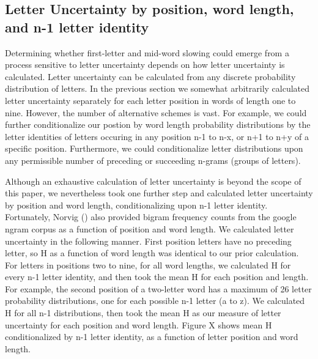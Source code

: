 \documentclass[floatsintext,man]{apa6}
\theoremstyle{definition}
\theoremstyle{definition}
\theoremstyle{definition}
\theoremstyle{remark}
\begin{document}
\subsection{Letter Uncertainty by position, word length, and n-1 letter
identity}\label{letter-uncertainty-by-position-word-length-and-n-1-letter-identity}

Determining whether first-letter and mid-word slowing could emerge from
a process sensitive to letter uncertainty depends on how letter
uncertainty is calculated. Letter uncertainty can be calculated from any
discrete probability distribution of letters. In the previous section we
somewhat arbitrarily calculated letter uncertainty separately for each
letter position in words of length one to nine. However, the number of
alternative schemes is vast. For example, we could further
conditionalize our postion by word length probability distributions by
the letter identities of letters occuring in any position n-1 to n-x, or
n+1 to n+y of a specific position. Furthermore, we could conditionalize
letter distributions upon any permissible number of preceding or
succeeding n-grams (groups of letters).

Although an exhaustive calculation of letter uncertainty is beyond the
scope of this paper, we nevertheless took one further step and
calculated letter uncertainty by position and word length,
conditionalizing upon n-1 letter identity. Fortunately, Norvig () also
provided bigram frequency counts from the google ngram corpus as a
function of position and word length. We calculated letter uncertainty
in the following manner. First position letters have no preceding
letter, so H as a function of word length was identical to our prior
calculation. For letters in positions two to nine, for all word lengths,
we calculated H for every n-1 letter identity, and then took the mean H
for each position and length. For example, the second position of a
two-letter word has a maximum of 26 letter probability distributions,
one for each possible n-1 letter (a to z). We calculated H for all n-1
distributions, then took the mean H as our measure of letter uncertainty
for each position and word length. Figure X shows mean H conditionalized
by n-1 letter identity, as a function of letter position and word
length.
\end{document}

